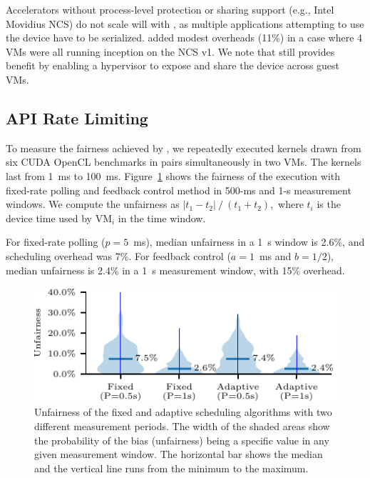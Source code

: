Accelerators without process-level protection or sharing support (e.g., Intel Movidius NCS) do not scale will with \model, as multiple applications attempting to use the device have to be serialized.
\model added modest overheads (11\%) in a case where 4 VMs were all running inception on the NCS v1. We note that \model still provides benefit by enabling a hypervisor to expose and share the device across guest VMs.

\subsection{API Rate Limiting}
\label{s:eval_rate_limit}

To measure the fairness achieved by \model, we repeatedly executed kernels drawn from six CUDA OpenCL benchmarks in pairs simultaneously in two VMs.
The kernels last from 1~ms to 100~ms.
Figure~\ref{fig:fairness} shows the fairness of the execution with fixed-rate polling and feedback control method in 500-ms and 1-s measurement windows.
We compute the unfairness as
$\left|t_1-t_2\right| \mathbin{/} (t_1+t_2),$
where $t_i$ is the device time used by VM$_i$ in the time window.

For fixed-rate polling ($p=5$~ms), median unfairness in a 1~s window is 2.6\%, and scheduling overhead was 7\%.
For feedback control ($a=1$~ms and $b=1/2$),
median unfairness is 2.4\% in a \SI{1}{\second} measurement window, with 15\% overhead.

\begin{figure}
	\centering
    \includegraphics[width=\columnwidth]{ava/data/rate_limit/bias_plot.pdf}%
    \vspace{-.35em}
	\caption{Unfairness of the fixed and adaptive scheduling algorithms with two different measurement periods.
      The width of the shaded areas show the probability of the bias (unfairness) being a specific value in any given measurement window.
      The horizontal bar shows the median and the vertical line runs from the minimum to the maximum.}
	\label{fig:fairness}
\end{figure}


